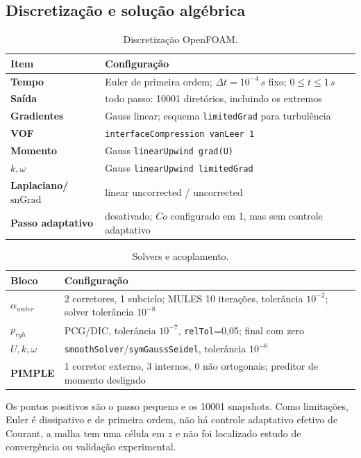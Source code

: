 \documentclass[12pt,a4paper]{article}
\newcommand{\code}[1]{\texttt{#1}}
\begin{document}
\subsection{Discretização e solução algébrica}
\begin{table}[H]\centering
\caption{Discretização OpenFOAM.}\label{tab:disc}
\begin{tabularx}{\textwidth}{>{\bfseries}l X}
\toprule Item & Configuração\\\midrule
Tempo & Euler de primeira ordem; $\Delta t=10^{-4}\,\si{s}$ fixo; $0\le t\le1\,\si{s}$\\
Saída & todo passo: 10001 diretórios, incluindo os extremos\\
Gradientes & Gauss linear; esquema \code{limitedGrad} para turbulência\\
VOF & \code{interfaceCompression vanLeer 1}\\
Momento & Gauss \code{linearUpwind grad(U)}\\
$k,\omega$ & Gauss \code{linearUpwind limitedGrad}\\
Laplaciano/$\mathrm{snGrad}$ & linear uncorrected / uncorrected\\
Passo adaptativo & desativado; $Co$ configurado em 1, mas sem controle adaptativo\\
\bottomrule\end{tabularx}\end{table}

\begin{table}[H]\centering
\caption{Solvers e acoplamento.}\label{tab:solvers}
\begin{tabularx}{\textwidth}{>{\bfseries}l X}
\toprule Bloco & Configuração\\\midrule
$\alpha_{water}$ & 2 corretores, 1 subciclo; MULES 10 iterações, tolerância $10^{-2}$; solver tolerância $10^{-8}$\\
$p_{rgh}$ & PCG/DIC, tolerância $10^{-7}$, \code{relTol}=0,05; final com zero\\
$U,k,\omega$ & \code{smoothSolver}/\code{symGaussSeidel}, tolerância $10^{-6}$\\
PIMPLE & 1 corretor externo, 3 internos, 0 não ortogonais; preditor de momento desligado\\
\bottomrule\end{tabularx}\end{table}

Os pontos positivos são o passo pequeno e os 10001 snapshots. Como limitações, Euler é dissipativo e de primeira ordem, não há controle adaptativo efetivo de Courant, a malha tem uma célula em $z$ e não foi localizado estudo de convergência ou validação experimental.
\end{document}
